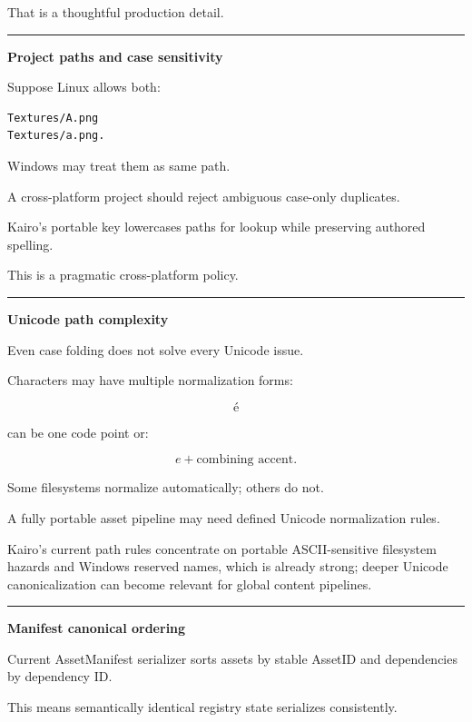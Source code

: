 That is a thoughtful production detail.

\begin{center}\rule{0.5\linewidth}{0.5pt}\end{center}

\textbf{Project paths and case sensitivity}

Suppose Linux allows both:

\begin{verbatim}
Textures/A.png
Textures/a.png.
\end{verbatim}

Windows may treat them as same path.

A cross-platform project should reject ambiguous case-only duplicates.

Kairo's portable key lowercases paths for lookup while preserving authored spelling.

This is a pragmatic cross-platform policy.

\begin{center}\rule{0.5\linewidth}{0.5pt}\end{center}

\textbf{Unicode path complexity}

Even case folding does not solve every Unicode issue.

Characters may have multiple normalization forms:

\[\text{é}\]

can be one code point or:

\[
e+\text{combining accent}.
\]

Some filesystems normalize automatically; others do not.

A fully portable asset pipeline may need defined Unicode normalization rules.

Kairo's current path rules concentrate on portable ASCII-sensitive filesystem hazards and Windows reserved names, which is already strong; deeper Unicode canonicalization can become relevant for global content pipelines.

\begin{center}\rule{0.5\linewidth}{0.5pt}\end{center}

\textbf{Manifest canonical ordering}

Current AssetManifest serializer sorts assets by stable AssetID and dependencies by dependency ID.

This means semantically identical registry state serializes consistently.


